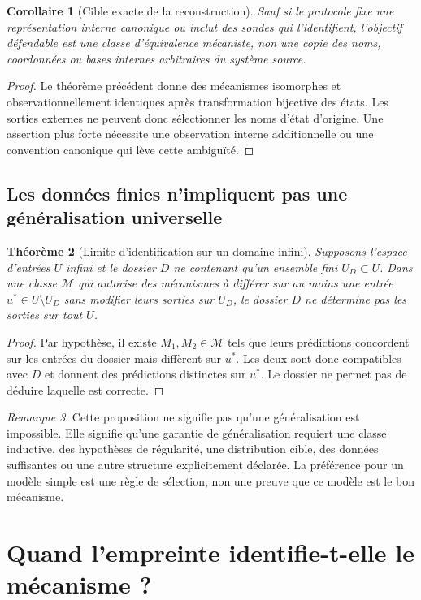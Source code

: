 \documentclass[11pt,oneside]{book}
\newtheorem{theoreme}{Théorème}[chapter]
\newtheorem{corollaire}[theoreme]{Corollaire}
\theoremstyle{definition}
\theoremstyle{remark}
\newtheorem{remarque}[theoreme]{Remarque}
\newcommand{\Mcal}{\mathcal M}
\newcommand{\1}{\mathbf 1}
\begin{document}
\begin{corollaire}[Cible exacte de la reconstruction]
Sauf si le protocole fixe une représentation interne canonique ou inclut des sondes qui l'identifient, l'objectif défendable est une classe d'équivalence mécaniste, non une copie des noms, coordonnées ou bases internes arbitraires du système source.
\end{corollaire}
\begin{proof}
Le théorème précédent donne des mécanismes isomorphes et observationnellement identiques après transformation bijective des états. Les sorties externes ne peuvent donc sélectionner les noms d'état d'origine. Une assertion plus forte nécessite une observation interne additionnelle ou une convention canonique qui lève cette ambiguïté.\end{proof}

\section{Les données finies n'impliquent pas une généralisation universelle}
\begin{theoreme}[Limite d'identification sur un domaine infini]
Supposons l'espace d'entrées $U$ infini et le dossier $D$ ne contenant qu'un ensemble fini $U_D\subset U$. Dans une classe $\Mcal$ qui autorise des mécanismes à différer sur au moins une entrée $u^*\in U\setminus U_D$ sans modifier leurs sorties sur $U_D$, le dossier $D$ ne détermine pas les sorties sur tout $U$.
\end{theoreme}
\begin{proof}
Par hypothèse, il existe $M_1,M_2\in\Mcal$ tels que leurs prédictions concordent sur les entrées du dossier mais diffèrent sur $u^*$. Les deux sont donc compatibles avec $D$ et donnent des prédictions distinctes sur $u^*$. Le dossier ne permet pas de déduire laquelle est correcte.\end{proof}

\begin{remarque}
Cette proposition ne signifie pas qu'une généralisation est impossible. Elle signifie qu'une garantie de généralisation requiert une classe inductive, des hypothèses de régularité, une distribution cible, des données suffisantes ou une autre structure explicitement déclarée. La préférence pour un modèle simple est une règle de sélection, non une preuve que ce modèle est le bon mécanisme.
\end{remarque}

\chapter{Quand l'empreinte identifie-t-elle le mécanisme ?}
\end{document}
